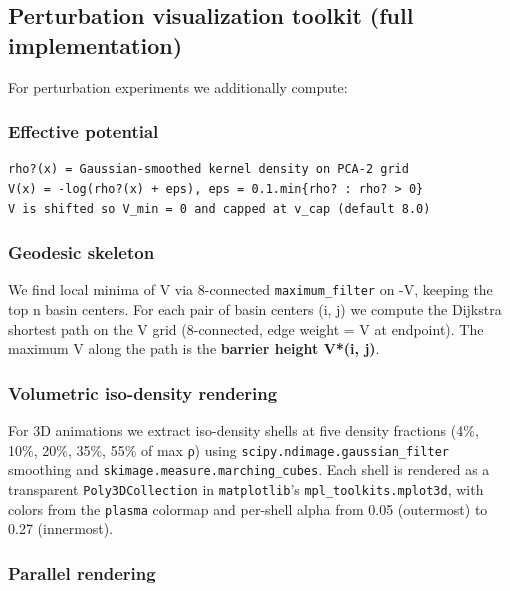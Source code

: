 \documentclass{article}
\newenvironment{asciiblock}[1][]{%
  \par\addvspace{2pt}%
  \ifstrempty{#1}{}{\noindent\textit{\small #1}\par\nobreak\addvspace{2pt}}%
  \begingroup\footnotesize\begin{mdframed}[style=codestyle]%
}{%
  \end{mdframed}\endgroup\par%
}
\theoremstyle{plain}
\theoremstyle{definition}
\begin{document}
\subsection{Perturbation visualization toolkit (full implementation)}

For perturbation experiments we additionally compute:

\subsubsection*{Effective potential}

\begin{asciiblock}
\begin{verbatim}
rho?(x) = Gaussian-smoothed kernel density on PCA-2 grid
V(x) = -log(rho?(x) + eps), eps = 0.1.min{rho? : rho? > 0}
V is shifted so V_min = 0 and capped at v_cap (default 8.0)
\end{verbatim}
\end{asciiblock}

\subsubsection*{Geodesic skeleton}

We find local minima of V via 8-connected \texttt{maximum\_filter} on -V,
keeping the top n basin centers. For each pair of basin centers
(i, j) we compute the Dijkstra shortest path on the V grid
(8-connected, edge weight = V at endpoint). The maximum V along
the path is the \textbf{barrier height V*(i, j)}.

\subsubsection*{Volumetric iso-density rendering}

For 3D animations we extract iso-density shells at five density
fractions (4\%, 10\%, 20\%, 35\%, 55\% of max ρ) using
\texttt{scipy.ndimage.gaussian\_filter} smoothing and
\texttt{skimage.measure.marching\_cubes}. Each shell is rendered as a
transparent \texttt{Poly3DCollection} in \texttt{matplotlib}'s
\texttt{mpl\_toolkits.mplot3d}, with colors from the \texttt{plasma} colormap and
per-shell alpha from 0.05 (outermost) to 0.27 (innermost).

\subsubsection*{Parallel rendering}
\end{document}
